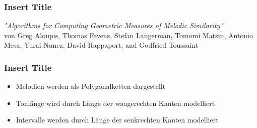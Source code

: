 \documentclass{beamer}
\begin{document}
    \begin{frame}
		\frametitle{Insert Title }
		\begin{minipage}{0.45\textwidth}
			\begin{center}
				\textit{"Algorithms for Computing Geometric Measures of Melodic Similarity"} 
				\cite{one}  \\ 
				von Greg Aloupis, Thomas Fevens, Stefan Langerman, Tomomi Matsui, Antonio Mesa, Yurai Nunez, David Rappaport, and Godfried Toussaint
			\end{center}
		\end{minipage}%
		\begin{minipage}{0.45\textwidth}
			\begin{figure}[h!]
			\end{figure}
		\end{minipage}
	\end{frame}
	
	\begin{frame}
        \frametitle{Insert Title}
        \begin{minipage}{0.45\textwidth}
            \begin{itemize}
             \item Melodien werden als Polygonalketten dargestellt
             \item Tonlänge wird durch Länge der waagerechten Kanten modelliert
             \item Intervalle werden durch Länge der senkrechten Kanten modelliert 
            \end{itemize}
        \end{minipage}
        \begin{minipage}{0.45\textwidth}
        \end{minipage}
	\end{frame}
\end{document}
